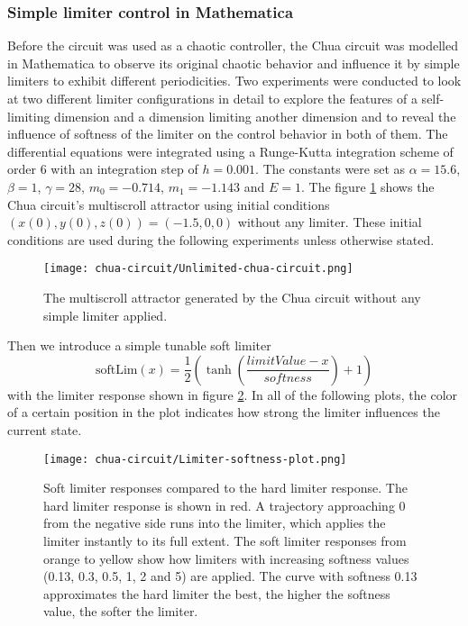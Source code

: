 \documentclass[main]{subfiles}
\begin{document}
\subsubsection{Simple limiter control in Mathematica}
\label{subsubsec:simple-limiter-mathematica}

Before the circuit was used as a chaotic controller, the Chua circuit was modelled in Mathematica to observe its original chaotic behavior and influence it by simple limiters to exhibit different periodicities. Two experiments were conducted to look at two different limiter configurations in detail to explore the features of a self-limiting dimension and a dimension limiting another dimension and to reveal the influence of softness of the limiter on the control behavior in both of them. The differential equations were integrated using a Runge-Kutta integration scheme of order 6 with an integration step of \(h=0.001\). The constants were set as \(\alpha = 15.6\), \(\beta = 1\), \(\gamma = 28\), \(m_0 = -0.714\), \(m_1 = -1.143\) and \(E = 1\). The figure \ref{figure:chaoticchuacircuit} shows the Chua circuit's multiscroll attractor using initial conditions \((x(0),y(0),z(0)) = (-1.5,0,0)\) without any limiter. These initial conditions are used during the following experiments unless otherwise stated.

\begin{figure}[H]
\centering
\texttt{[image: chua-circuit/Unlimited-chua-circuit.png]}
\caption[The multiscroll attractor in the Chua circuit]{The multiscroll attractor generated by the Chua circuit without any simple limiter applied.}
\label{figure:chaoticchuacircuit}
\end{figure}

Then we introduce a simple tunable soft limiter \[\text{softLim}(x) = \frac{1}{2} \left(\tanh\left(\frac{limitValue - x}{softness}\right) + 1\right)\] with the limiter response shown in figure \ref{figure:softlimiterresponse}. In all of the following plots, the color of a certain position in the plot indicates how strong the limiter influences the current state.

\begin{figure}[H]
\centering
\texttt{[image: chua-circuit/Limiter-softness-plot.png]}
\caption[Soft limiter responses]{Soft limiter responses compared to the hard limiter response. The hard limiter response is shown in red. A trajectory approaching 0 from the negative side runs into the limiter, which applies the limiter instantly to its full extent. The soft limiter responses from orange to yellow show how limiters with increasing softness values (0.13, 0.3, 0.5, 1, 2 and 5) are applied. The curve with softness 0.13 approximates the hard limiter the best, the higher the softness value, the softer the limiter.}
\label{figure:softlimiterresponse}
\end{figure}
\end{document}
